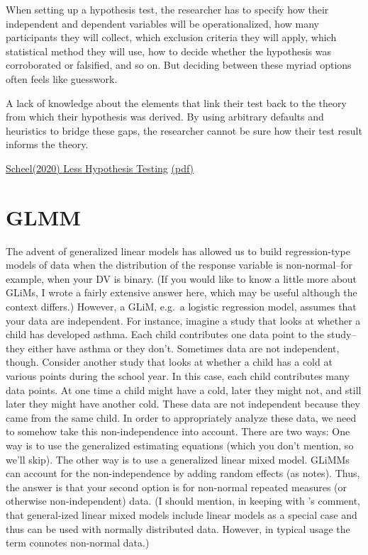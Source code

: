 \documentclass[
]{book}
\begin{document}
When setting up a hypothesis test, the researcher has to specify
how their independent and dependent variables will
be operationalized, how many participants they will
collect, which exclusion criteria they will apply, which
statistical method they will use, how to decide whether
the hypothesis was corroborated or falsified, and so on.
But deciding between these myriad options often feels
like guesswork.

A lack of knowledge about the elements that link their test
back to the theory from which their hypothesis was
derived. By using arbitrary defaults and heuristics to
bridge these gaps, the researcher cannot be sure how
their test result informs the theory.

\href{https://journals.sagepub.com/doi/full/10.1177/1745691620966795}{Scheel(2020) Less Hypothesis Testing}
\href{pdf/Scheel_2020_Less_Hypothesis_Testing.pdf}{(pdf)}

\hypertarget{glmm}{%
\section{GLMM}\label{glmm}}

The advent of generalized linear models has allowed us to build regression-type models of data when the distribution of the response variable is non-normal--for example, when your DV is binary. (If you would like to know a little more about GLiMs, I wrote a fairly extensive answer here, which may be useful although the context differs.) However, a GLiM, e.g.~a logistic regression model, assumes that your data are independent. For instance, imagine a study that looks at whether a child has developed asthma. Each child contributes one data point to the study--they either have asthma or they don't. Sometimes data are not independent, though. Consider another study that looks at whether a child has a cold at various points during the school year. In this case, each child contributes many data points. At one time a child might have a cold, later they might not, and still later they might have another cold. These data are not independent because they came from the same child. In order to appropriately analyze these data, we need to somehow take this non-independence into account. There are two ways: One way is to use the generalized estimating equations (which you don't mention, so we'll skip). The other way is to use a generalized linear mixed model. GLiMMs can account for the non-independence by adding random effects (as \citet{MichaelChernick} notes). Thus, the answer is that your second option is for non-normal repeated measures (or otherwise non-independent) data. (I should mention, in keeping with \citet{Macro}'s comment, that general-ized linear mixed models include linear models as a special case and thus can be used with normally distributed data. However, in typical usage the term connotes non-normal data.)
\end{document}
